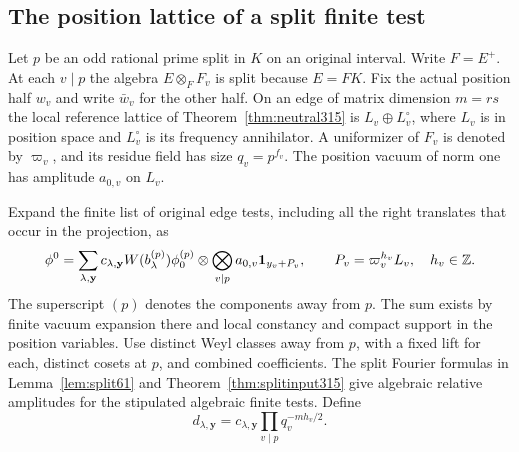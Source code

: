 \documentclass[a4paper,11pt]{article}
\theoremstyle{definition}
\theoremstyle{remark}
\newcommand{\ZZ}{\mathbb Z}\newcommand{\ord}{\operatorname{ord}}
\numberwithin{equation}{section}
\begin{document}
\subsection{The position lattice of a split finite test}\label{nav:V-62}
Let \(p\) be an odd rational prime split in \(K\) on an original
interval. Write \(F=E^+\). At each \(v\mid p\) the algebra
\(E\otimes_F F_v\) is split because \(E=FK\). Fix the actual
position half \(w_v\) and write \(\bar w_v\) for the other half.
On an edge of matrix dimension \(m=rs\) the local reference
lattice of Theorem~\ref{thm:neutral315} is
\(L_v\oplus L_v^\circ\), where \(L_v\) is in position space
and \(L_v^\circ\) is its frequency annihilator. A uniformizer
of \(F_v\) is denoted by \(\varpi_v\), and its residue field has
size \(q_v=p^{f_v}\). The position vacuum of norm one has
amplitude \(a_{0,v}\) on \(L_v\).

Expand the finite list of original edge tests, including all
the right translates that occur in the projection, as
\[
 \phi^0=\sum_{\lambda,\mathbf y} c_{\lambda,\mathbf y}
 W(b_\lambda^{(p)})\phi_0^{(p)}
       \otimes\bigotimes_{v\mid p}a_{0,v}{\bf1}_{y_v+P_v},
 \qquad P_v=\varpi_v^{h_v}L_v,\quad h_v\in\ZZ .
\]
The superscript \((p)\) denotes the components away from \(p\).
The sum exists by finite vacuum expansion there and local
constancy and compact support in the position variables. Use
distinct Weyl classes away from \(p\), with a fixed lift for
each, distinct cosets at \(p\), and combined coefficients.
The split Fourier formulas in Lemma~\ref{lem:split61} and
Theorem~\ref{thm:splitinput315} give algebraic relative
amplitudes for the stipulated algebraic finite tests. Define
\[
   d_{\lambda,\mathbf y}=c_{\lambda,\mathbf y}
                \prod_{v\mid p}q_v^{-m h_v/2}.
\]
\end{document}
